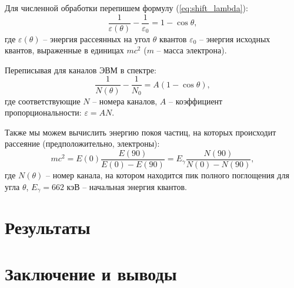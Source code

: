 \documentclass[12pt,a4paper]{article}
\begin{document}
	Для численной обработки перепишем формулу (\ref{eq:shift_lambda}):
	\begin{equation*}
		\frac{1}{\varepsilon(\theta)} - \frac{1}{\varepsilon_0} = 1 - \cos \theta,
		\label{eq:shift_epsilon}
	\end{equation*}
	где $\varepsilon(\theta)$ -- энергия рассеянных на угол $\theta$ квантов $\varepsilon_0$ -- энергия исходных квантов, выраженные в единицах $mc^2$ ($m$ -- масса электрона).
	
	Переписывая для каналов ЭВМ в спектре:
	\begin{equation}
		\frac{1}{N(\theta)} - \frac{1}{N_0} = A (1 - \cos \theta),
		\label{eq:shift_n}
	\end{equation}
	где соответствующие $N$ -- номера каналов, $A$ -- коэффициент пропорциональности: $\varepsilon = A N$.
	
	Также мы можем вычислить энергию покоя частиц, на которых происходит рассеяние (предположительно, электроны):
	\begin{equation}
		mc^2 = E(0) \frac{E(90)}{E(0) - E(90)} = E_{\gamma} \frac{N(90)}{N(0) - N(90)},
	\end{equation}
	где $N(\theta)$ -- номер канала, на котором находится пик полного поглощения для угла $\theta$, $E_{\gamma} = 662$ кэВ -- начальная энергия квантов.

	\section*{Результаты}
	

	\section*{Заключение и выводы}
	
\end{document}
